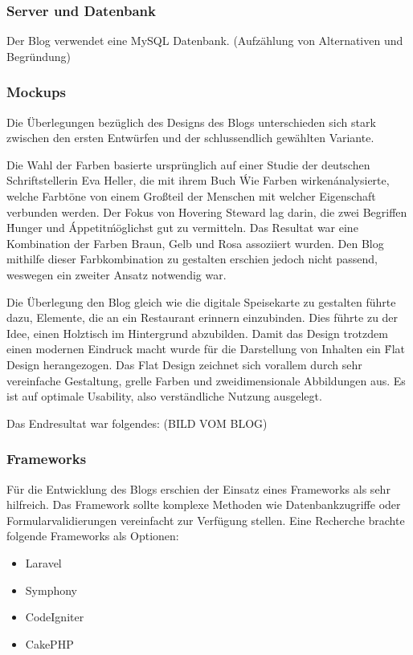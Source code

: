     \subsubsection{Server und Datenbank}
    Der Blog verwendet eine MySQL Datenbank. (Aufzählung von Alternativen und Begründung)
    \subsubsection{Mockups}
    Die Überlegungen bezüglich des Designs des Blogs unterschieden sich stark zwischen den ersten
    Entwürfen und der schlussendlich gewählten Variante.

    Die Wahl der Farben basierte ursprünglich auf einer Studie der deutschen Schriftstellerin Eva Heller,
    die mit ihrem Buch \'Wie Farben wirken\' analysierte, welche Farbtöne von einem Großteil der Menschen
    mit welcher Eigenschaft verbunden werden. Der Fokus von Hovering Steward lag darin, die zwei Begriffen {\'Hunger\'\cite{WieFarbenWirken}}
    und \'Appetit\' möglichst gut zu vermitteln. Das Resultat war eine Kombination der Farben Braun, Gelb und Rosa
    assoziiert wurden. Den Blog mithilfe dieser Farbkombination zu gestalten erschien jedoch nicht passend, weswegen
    ein zweiter Ansatz notwendig war.

    Die Überlegung den Blog gleich wie die digitale Speisekarte zu gestalten führte dazu, Elemente, die an ein Restaurant
    erinnern einzubinden. Dies führte zu der Idee, einen Holztisch im Hintergrund abzubilden.
    Damit das Design trotzdem einen modernen Eindruck macht wurde für die Darstellung von Inhalten ein {\'Flat Design\'\cite{FlatDesgin}}
    herangezogen. Das Flat Design zeichnet sich vorallem durch sehr vereinfache Gestaltung, grelle Farben und zweidimensionale Abbildungen aus.
    Es ist auf optimale Usability, also verständliche Nutzung ausgelegt.

    Das Endresultat war folgendes:
    (BILD VOM BLOG)
    \subsubsection{Frameworks}
    Für die Entwicklung des Blogs erschien der Einsatz eines Frameworks als sehr hilfreich. Das Framework sollte komplexe Methoden wie
    Datenbankzugriffe oder Formularvalidierungen vereinfacht zur Verfügung stellen. Eine Recherche brachte folgende Frameworks als
    Optionen:
    \begin{itemize}
      \item Laravel
      \item Symphony
      \item CodeIgniter
      \item CakePHP
    \end{itemize}

